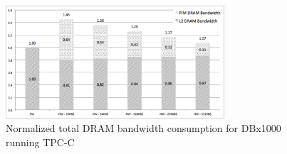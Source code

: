 \begin{figure}[h]
  \centering
  \includegraphics[width=3.2in]{figures/bt_dram_bandwidth.pdf}
  \caption{Normalized total DRAM bandwidth consumption for DBx1000 running TPC-C}
  \label{fig:bt_dram_bandwidth}
\end{figure}
